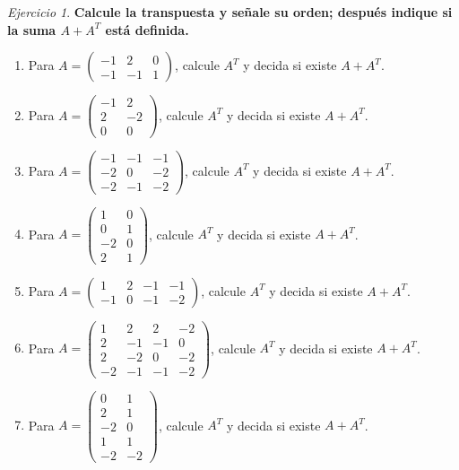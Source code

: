 \documentclass[12pt]{article}
\theoremstyle{remark}
\newtheorem{Ejer}[definicion]{Ejercicio}
\begin{document}
\begin{Ejer}

\textbf{Calcule la transpuesta y señale su orden; después indique si la suma $A+A^T$ está definida.}
\begin{enumerate}[resume=banco]

\item Para $A=\begin{pmatrix}-1&2&0\\-1&-1&1\end{pmatrix}$, calcule $A^T$ y decida si existe $A+A^T$.

\item Para $A=\begin{pmatrix}-1&2\\2&-2\\0&0\end{pmatrix}$, calcule $A^T$ y decida si existe $A+A^T$.

\item Para $A=\begin{pmatrix}-1&-1&-1\\-2&0&-2\\-2&-1&-2\end{pmatrix}$, calcule $A^T$ y decida si existe $A+A^T$.

\item Para $A=\begin{pmatrix}1&0\\0&1\\-2&0\\2&1\end{pmatrix}$, calcule $A^T$ y decida si existe $A+A^T$.

\item Para $A=\begin{pmatrix}1&2&-1&-1\\-1&0&-1&-2\end{pmatrix}$, calcule $A^T$ y decida si existe $A+A^T$.

\item Para $A=\begin{pmatrix}1&2&2&-2\\2&-1&-1&0\\2&-2&0&-2\\-2&-1&-1&-2\end{pmatrix}$, calcule $A^T$ y decida si existe $A+A^T$.

\item Para $A=\begin{pmatrix}0&1\\2&1\\-2&0\\1&1\\-2&-2\end{pmatrix}$, calcule $A^T$ y decida si existe $A+A^T$.


\end{enumerate}
\end{Ejer}
\end{document}
